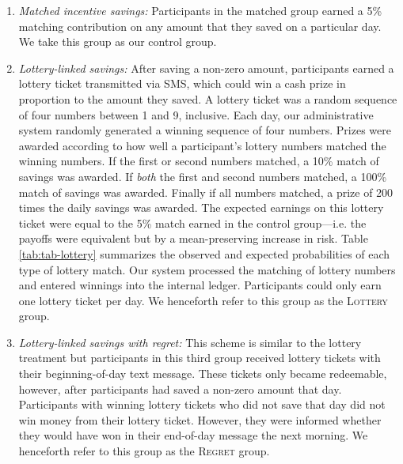 \documentclass[11pt]{article}
\begin{document}
		\begin{enumerate} \setlength{\itemsep}{1pt}

			\item \textit{Matched incentive savings:} Participants in the matched group earned a 5\% matching contribution on any amount that they saved on a particular day. We take this group as our control group.

			\item \textit{Lottery-linked savings:} After saving a non-zero amount, participants earned a lottery ticket transmitted via SMS, which could win a cash prize in proportion to the amount they saved. A lottery ticket was a random sequence of four numbers between 1 and 9, inclusive. Each day, our administrative system randomly generated a winning sequence of four numbers. Prizes were awarded according to how well a participant's lottery numbers matched the winning numbers. If the first or second numbers matched, a 10\% match of savings was awarded. If \emph{both} the first and second numbers matched, a 100\% match of savings was awarded. Finally if all numbers matched, a prize of 200 times the daily savings was awarded. The expected earnings on this lottery ticket were equal to the 5\% match earned in the control group---i.e. the payoffs were equivalent but by a mean-preserving increase in risk. Table \ref{tab:tab-lottery} summarizes the observed and expected probabilities of each type of lottery match. Our system processed the matching of lottery numbers and entered winnings into the internal ledger. Participants could only earn one lottery ticket per day. We henceforth refer to this group as the \textsc{Lottery} group.

			\item \textit{Lottery-linked savings with regret:} This scheme is similar to the lottery treatment but participants in this third group received lottery tickets with their beginning-of-day text message. These tickets only became redeemable, however, after participants had saved a non-zero amount that day. Participants with winning lottery tickets who did not save that day did not win money from their lottery ticket. However, they were informed whether they would have won in their end-of-day message the next morning. We henceforth refer to this group as the \textsc{Regret} group.

		\end{enumerate}

		
		
\end{document}
